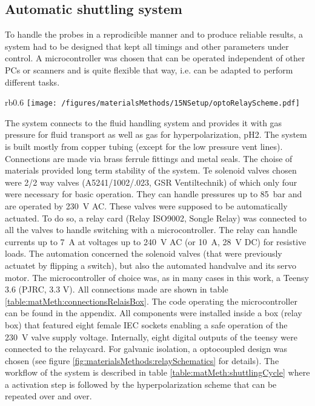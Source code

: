         \subsection{Automatic shuttling system}
            To handle the probes in a reprodicible manner and to produce reliable results, a system had to be designed that kept all timings and other parameters under control. A microcontroller was chosen that can be operated independent of other PCs or scanners and is quite flexible that way, i.e. can be adapted to perform different tasks.
            \begin{wrapfigure}{rb}{0.6\textwidth}
                \texttt{[image: /figures/materialsMethods/15NSetup/optoRelayScheme.pdf]}
                \caption[Relay schematics]{One relay module of which 8 were mounted onto a single PCB board in this case. Note the galvanic isolation through the optocoupler in the top center of the schematics.}
                \label{fig:materialsMethods:relaySchematics}
            \end{wrapfigure}
            The system connects to the fluid handling system and provides it with gas pressure for fluid transport as well as gas for hyperpolarization, pH2. The system is built mostly from copper tubing (except for the low pressure vent lines). Connections are made via brass ferrule fittings and metal seals. The choise of materials provided long term stability of the system. Te solenoid valves chosen were 2/2 way valves (A5241/1002/.023, GSR Ventiltechnik) of which only four were necessary for basic operation. They can handle pressures up to \SI{85}{\bar} and are operated by \SI{230}{\volt} AC. These valves were supposed to be automatically actuated.
            To do so, a relay card (Relay ISO9002, Songle Relay) was connected to all the valves to handle switching with a microcontroller. The relay can handle currents up to \SI{7}{\ampere} at voltages up to \SI{240}{\volt} AC (or \SI{10}{\ampere}, \SI{28}{\volt} DC) for resistive loads. The automation concerned the solenoid valves (that were previously actuatet by flipping a switch), but also the automated handvalve and its servo motor. The microcontroller of choice was, as in many cases in this work, a Teensy 3.6 (PJRC, 3.3 V). All connections made are shown in table \ref{table:matMeth:connectionsRelaisBox}. The code operating the microcontroller can be found in the appendix. All components were installed inside a box (relay box) that featured eight female IEC sockets enabling a safe operation of the \SI{230}{\volt} valve supply voltage.  Internally, eight digital outputs of the teensy were connected to the relaycard.  For galvanic isolation, a optocoupled design was chosen (see figure \ref{fig:materialsMethods:relaySchematics} for details). The workflow of the system is described in table \ref{table:matMeth:shuttlingCycle} where a activation step is followed by the hyperpolarization scheme that can be repeated over and over.
